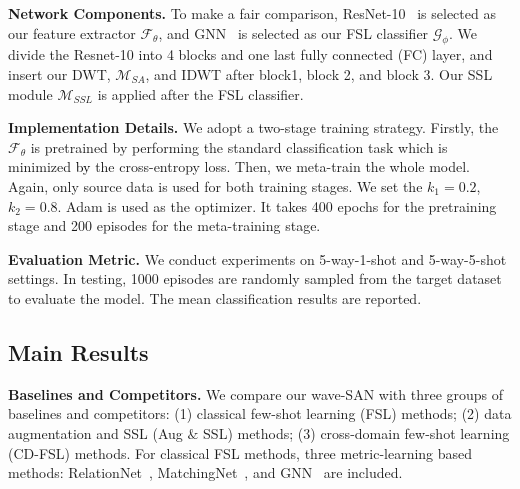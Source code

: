 \documentclass{article}
\newcommand{\fyq}{\textcolor{black}}
\begin{document}
	
	
\noindent\textbf{Network Components.} 
To make a fair comparison, ResNet-10~\cite{he2016deep} is selected as our feature extractor $\mathcal{F_\theta}$, and GNN~\cite{garcia2017few} is selected as our FSL classifier $\mathcal{G_\phi}$. We divide the Resnet-10 into 4 blocks and one last fully connected (FC) layer, and insert our DWT, $\mathcal{M}_{SA}$, and IDWT after block1, block 2, and block 3.  Our SSL module $\mathcal{M}_{SSL}$ is applied after the FSL classifier.
	
	
\noindent\textbf{Implementation Details.} 
We adopt a two-stage training strategy. Firstly, the  $\mathcal{F_\theta}$ is pretrained by performing the standard classification task which is minimized \fyq{by} the cross-entropy loss. Then, we meta-train the whole model. Again, only source data is used for both training stages. We set the $k_1=0.2$, $k_2=0.8$. 
Adam is used as the optimizer. It takes 400 epochs for the pretraining stage and 200 episodes for the meta-training stage.
	
\noindent\textbf{Evaluation Metric.} We conduct experiments on 5-way-1-shot and 5-way-5-shot settings. In testing, 1000 episodes are randomly sampled from the target dataset to evaluate the model. The mean classification results are reported. 
	
	


	
	
	
	
	
\subsection{Main Results}
	
\noindent\textbf{Baselines and Competitors.} 
We compare our wave-SAN with three groups of baselines and competitors: (1) classical few-shot learning (FSL) methods; (2) data augmentation and SSL (Aug $\&$ SSL) methods; (3) cross-domain few-shot learning (CD-FSL) methods. For classical FSL methods, three metric-learning based methods: RelationNet~\cite{sung2018learning}, MatchingNet~\cite{vinyals2016matching}, and GNN~\cite{garcia2017few} are included. 
\end{document}
